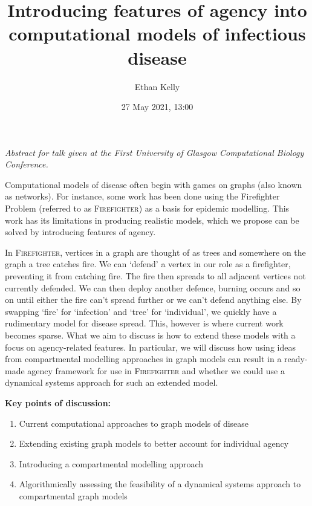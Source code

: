 \documentclass[12pt,a4paper]{article}
\author{Ethan Kelly}
\title{Introducing features of agency into computational models of infectious disease}
\date{27 May 2021, 13:00}
\begin{document}
\maketitle

\begin{centering}
{\it Abstract for talk given at the First University of Glasgow Computational Biology Conference.}\\
\end{centering}

\vspace{5pt}

Computational models of disease often begin with games on graphs (also known as networks). For instance, some work has been done using the Firefighter Problem (referred to as {\scshape Firefighter}) as a basis for epidemic modelling. This work has its limitations in producing realistic models, which we propose can be solved by introducing features of agency.

In {\scshape Firefighter}, vertices in a graph are thought of as trees and somewhere on the graph a tree catches fire. We can `defend' a vertex in our role as a firefighter, preventing it from catching fire. The fire then spreads to all adjacent vertices not currently defended. We can then deploy another defence, burning occurs and so on until either the fire can't spread further or we can't defend anything else. By swapping `fire' for `infection' and `tree' for `individual', we quickly have a rudimentary model for disease spread. This, however is where current work becomes sparse. What we aim to discuss is how to extend these models with a focus on agency-related features. In particular, we will discuss how using ideas from compartmental modelling approaches in graph models can result in a ready-made agency framework for use in {\scshape Firefighter} and whether we could use a dynamical systems approach for such an extended model.

\hspace{2in}

{\bf Key points of discussion:}
\begin{enumerate}
\item Current computational approaches to graph models of disease
\item Extending existing graph models to better account for individual agency
\item Introducing a compartmental modelling approach
\item Algorithmically assessing the feasibility of a dynamical systems approach to compartmental graph models
\end{enumerate}
\end{document}
